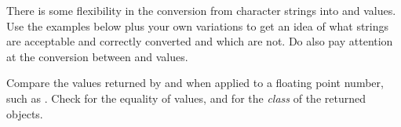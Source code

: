 \documentclass[krantz2]{krantz}\usepackage{knitr}
\begin{document}
\begin{playground}
There is some flexibility in the conversion from character strings into  and  values. Use the examples below plus your own variations to get an idea of what strings are acceptable and correctly converted and which are not. Do also pay attention at the conversion between  and  values.

\begin{knitrout}\footnotesize
{}\color{fgcolor}\begin{kframe}
\begin{alltt}
\hlstd{(}\hlstd{)}
\hlstd{(}\hlstd{)}
\hlstd{(}\hlstd{)}
\hlstd{(}\hlstd{)}
\hlstd{(}\hlstd{)}
\hlstd{(}\hlstd{)}
\hlstd{(}\hlstd{)}
\hlstd{(}\hlstd{)}
\hlstd{(}\hlstd{)}
\hlstd{(}\hlstd{)}
\hlstd{(}\hlopt{-}\hlstd{)}
\end{alltt}
\end{kframe}
\end{knitrout}

\end{playground}

\begin{playground}
Compare the values returned by  and  when applied to a floating point number, such as . Check for the equality of values, and for the \emph{class} of the returned objects.
\end{playground}
\end{document}
